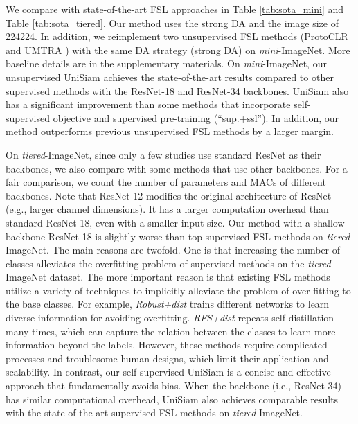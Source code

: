\documentclass[runningheads]{llncs}
\begin{document}
We compare with state-of-the-art FSL approaches in Table \ref{tab:sota_mini} and Table \ref{tab:sota_tiered}. 
Our method uses the strong DA and the image size of 224224.
In addition, we reimplement two unsupervised FSL methods (ProtoCLR \cite{medina2020self} and UMTRA \cite{khodadadeh2019unsupervised}) with the same DA strategy (strong DA) on \emph{mini}-ImageNet. 
More baseline details are in the supplementary materials.
On \emph{mini}-ImageNet, our unsupervised UniSiam achieves the state-of-the-art results compared to other supervised methods with the ResNet-18 and ResNet-34 backbones.
UniSiam also has a significant improvement than some methods that incorporate self-supervised objective and supervised pre-training (``sup.+ssl'').
In addition, our method outperforms previous unsupervised FSL methods \cite{medina2020self,khodadadeh2019unsupervised} by a larger margin.




On \emph{tiered}-ImageNet, since only a few studies use standard ResNet \cite{he2016deep} as their backbones, we also compare with some methods that use other backbones.
For a fair comparison, we count the number of parameters and MACs of different backbones.
Note that ResNet-12 modifies the original architecture of ResNet (e.g., larger channel dimensions). 
It has a larger computation overhead than standard ResNet-18, even with a smaller input size.
Our method with a shallow backbone ResNet-18 is slightly worse than top supervised FSL methods on \emph{tiered}-ImageNet. The main reasons are twofold. One is that increasing the number of classes alleviates the overfitting problem of supervised methods on the \emph{tiered}-ImageNet dataset. The more important reason is that existing FSL methods utilize a variety of techniques to implicitly alleviate the problem of over-fitting to the base classes. For example, \textit{Robust+dist} \cite{dvornik2019diversity} trains  different networks to learn diverse information for avoiding overfitting.  \textit{RFS+dist} \cite{tian2020rethinking} repeats self-distillation many times, which can capture the relation between the classes to learn more information beyond the labels. However, these methods require complicated processes and troublesome human designs, which limit their application and scalability. In contrast, our self-supervised UniSiam is a concise and effective approach that fundamentally avoids bias. When the backbone (i.e., ResNet-34) has similar computational overhead, UniSiam also achieves comparable results with the state-of-the-art supervised FSL methods on \emph{tiered}-ImageNet.
\end{document}
